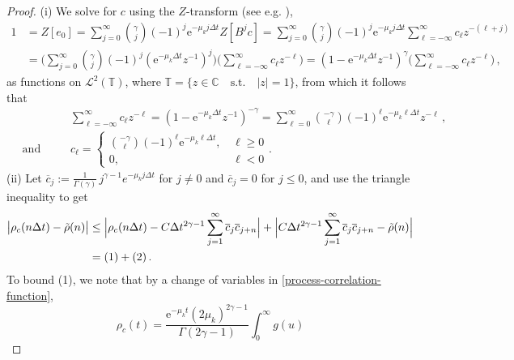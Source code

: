 \documentclass[12pt]{article} %
\begin{document}
\begin{proof}
(i) We solve for $c$ using the $Z$-transform (see e.g. \cite{Oppenheim}),
%
\begin{align*}
    1 & = Z[e_0] = \sum_{j = 0}^\infty \binom{\gamma}{j} (-1)^j \mathrm{e}^{-\mu_k j\Delta t } Z[B^j c] 
    = \sum_{j = 0}^\infty \binom{\gamma}{j} (-1)^j \mathrm{e}^{-\mu_k j\Delta t } \sum_{\ell = -\infty}^\infty c_\ell z^{-(\ell + j)} \\
    &= \bigg(\sum_{j = 0}^\infty \binom{\gamma}{j} (-1)^j (\mathrm{e}^{-\mu_k \Delta t} z^{-1})^j \bigg) \bigg(\sum_{\ell = -\infty}^\infty c_\ell z^{-\ell} \bigg) 
    = (1 - \mathrm{e}^{- \mu_k \Delta t} z^{-1})^\gamma \bigg(\sum_{\ell = -\infty}^\infty c_\ell z^{-\ell} \bigg) \, ,
\end{align*}
%
as functions on $\mathcal{L}^2(\mathbb{T})$, where $\mathbb{T} = \{z \in \mathbb{C} \quad \text{s.t.} \quad |z| = 1\}$, from which it follows that
\begin{align*}
    & \quad \sum_{\ell = -\infty}^\infty c_\ell z^{-\ell} = (1 - \mathrm{e}^{- \mu_k \Delta t} z^{-1})^{-\gamma} = \sum_{\ell = 0}^\infty \binom{-\gamma}{\ell} (-1)^\ell \mathrm{e}^{-\mu_k \ell\Delta t } z^{-\ell} \, , \\
    \quad \text{and hence} & \quad c_{\ell} = \begin{cases} \binom{-\gamma}{\ell} (-1)^{\ell} \mathrm{e}^{-\mu_k {\ell}  \Delta t }, \, & \ell \geq 0 \\
0, & \ell < 0
\end{cases}.
\end{align*}
\noindent (ii) Let $\overline{c}_j :=\frac{1}{\Gamma(\gamma)} \,j^{\gamma - 1} e^{- \mu_k j\Delta t}$ for $j\neq 0$ and $\overline{c}_{j}=0$ for $j \leq 0$, 
and use the triangle inequality to get
\begin{align*}
\big|\rho_c( n\Delta t ) - \Tilde{\rho}(n)\big| & \leq \Big|\rho_c( n\Delta t ) - C \Delta t^{2 \gamma - 1} \sum_{j = 1}^{\infty} \overline{c}_j \overline{c}_{j +n} \Big| + \Big| C \Delta t^{2 \gamma - 1} \sum_{j = 1}^{\infty} \overline{c}_j \overline{c}_{j + n} - \Tilde{\rho}(n)\Big| \\ & = (1) + (2) \, .
\end{align*}
To bound (1), we note that by a change of variables  in \eqref{process-correlation-function},
%
$$\rho_c(t) =  \frac{\mathrm{e}^{-\mu_k t} (2 \mu_k)^{2 \gamma - 1}}{\Gamma(2 \gamma - 1)} \int_{0}^{\infty}  g(u)
$$
\end{proof}
\end{document}
